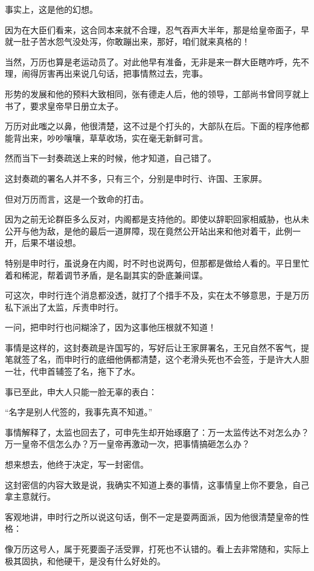 \begin{multicols}{\theparacolNo}
		事实上，这是他的幻想。

		因为在大臣们看来，这合同本来就不合理，忍气吞声大半年，那是给皇帝面子，早就一肚子苦水怨气没处泻，你敢蹦出来，那好，咱们就来真格的！

		当然，万历也算是老运动员了。对此他早有准备，无非是来一群大臣瞎咋呼，先不理，闹得厉害再出来说几句话，把事情熬过去，完事。

		形势的发展和他的预料大致相同，张有德走人后，他的领导，工部尚书曾同亨就上书了，要求皇帝早日册立太子。

		万历对此嗤之以鼻，他很清楚，这不过是个打头的，大部队在后。下面的程序他都能背出来，吵吵嚷嚷，草草收场，实在毫无新鲜可言。

		然而当下一封奏疏送上来的时候，他才知道，自己错了。

		这封奏疏的署名人并不多，只有三个，分别是申时行、许国、王家屏。

		但对万历而言，这是一个致命的打击。

		因为之前无论群臣多么反对，内阁都是支持他的。即使以辞职回家相威胁，也从未公开与他为敌，是他的最后一道屏障，现在竟然公开站出来和他对着干，此例一开，后果不堪设想。

		特别是申时行，虽说身在内阁，时不时也说两句，但那都是做给人看的。平日里忙着和稀泥，帮着调节矛盾，是名副其实的卧底兼间谍。

		可这次，申时行连个消息都没透，就打了个措手不及，实在太不够意思，于是万历私下派出了太监，斥责申时行。

		一问，把申时行也问糊涂了，因为这事他压根就不知道！

		事情是这样的，这封奏疏是许国写的，写好后让王家屏署名，王兄自然不客气，提笔就签了名，而申时行的底细他俩都清楚，这个老滑头死也不会签，于是许大人胆一壮，代申首辅签了名，拖下了水。

		事已至此，申大人只能一脸无辜的表白：

		“名字是别人代签的，我事先真不知道。”

		事情解释了，太监也回去了，可申先生却开始琢磨了：万一太监传达不对怎么办？万一皇帝不信怎么办？万一皇帝再激动一次，把事情搞砸怎么办？

		想来想去，他终于决定，写一封密信。

		这封密信的内容大致是说，我确实不知道上奏的事情，这事情皇上你不要急，自己拿主意就行。

		客观地讲，申时行之所以说这句话，倒不一定是耍两面派，因为他很清楚皇帝的性格：

		像万历这号人，属于死要面子活受罪，打死也不认错的。看上去非常随和，实际上极其固执，和他硬干，是没有什么好处的。


\end{multicols}
